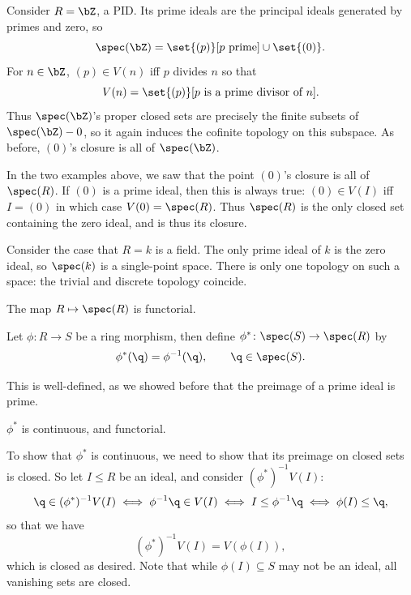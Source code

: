 \eexam

\bexam

    Consider $R=\bZ$, a PID.
    Its prime ideals are the principal ideals generated by primes and zero, so
    $$ \spec(\bZ) = \set{(p)}[\hbox{$p$ prime}] \cup \set{(0)} . $$
    For $n\in\bZ$, $(p)\in V(n)$ iff $p$ divides $n$ so that
    $$ V(n) = \set{(p)}[\hbox{$p$ is a prime divisor of $n$}] . $$
    Thus $\spec(\bZ)$'s proper closed sets are precisely the finite subsets of $\spec(\bZ)-0$, so it again induces the cofinite topology on this subspace.
    As before, $(0)$'s closure is all of $\spec(\bZ)$.

\eexam

In the two examples above, we saw that the point $(0)$'s closure is all of $\spec(R)$.
If $(0)$ is a prime ideal, then this is always true: $(0)\in V(I)$ iff $I=(0)$ in which case $V(0)=\spec(R)$.
Thus $\spec(R)$ is the only closed set containing the zero ideal, and is thus its closure.

\bexam

    Consider the case that $R=k$ is a field.
    The only prime ideal of $k$ is the zero ideal, so $\spec(k)$ is a single-point space.
    There is only one topology on such a space: the trivial and discrete topology coincide.

\eexam

The map $R\mapsto\spec(R)$ is functorial.

\bdefn

    Let $\phi\colon R\to S$ be a ring morphism, then define $\phi^*\colon\spec(S)\to\spec(R)$ by
    $$ \phi^*(\q) = \phi^{-1}(\q),\qquad \q\in\spec(S) . $$

\edefn

This is well-defined, as we showed before that the preimage of a prime ideal is prime.

\bprop

    $\phi^*$ is continuous, and functorial.

\eprop

\bproof

    To show that $\phi^*$ is continuous, we need to show that its preimage on closed sets is closed.
    So let $I\leq R$ be an ideal, and consider $(\phi^*)^{-1}V(I)$:
    $$ \q \in (\phi^*)^{-1}V(I) \iff \phi^{-1}\q \in V(I) \iff I \leq \phi^{-1}\q \iff \phi(I) \leq \q , $$
    so that we have
    $$ (\phi^*)^{-1}V(I) = V(\phi(I)) , $$
    which is closed as desired.
    Note that while $\phi(I)\subseteq S$ may not be an ideal, all vanishing sets are closed.


